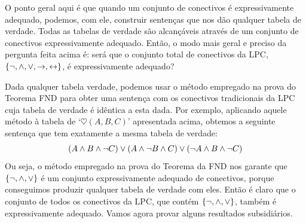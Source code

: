 O ponto geral aqui é que quando um conjunto de conectivos é expressivamente adequado, podemos, com ele, construir sentenças que nos dão qualquer tabela de verdade.
Todas as tabelas de verdade são alcançáveis através de um conjunto de conectivos expressivamente adequado.
Então, o modo mais geral e preciso da pergunta feita acima é: será que o conjunto total de conectivos da LPC, $\{\neg, \wedge, \vee, \rightarrow, \leftrightarrow\}$, é expressivamente adequado?

Dada qualquer tabela verdade, podemos usar o método empregado na prova do Teorema FND para obter uma sentença com os conectivos tradicionais da LPC cuja tabela de verdade é idêntica a esta dada.
Por exemplo, aplicando aquele método à tabela de `$\heartsuit(A, B, C)$' apresentada acima,  obtemos a seguinte sentença que tem exatamente a mesma tabela de verdade:
		$$(A \wedge B \wedge \neg C) \vee (A \wedge \neg B \wedge C) \vee (\neg A \wedge B \wedge \neg C)$$			
Ou seja, o método empregado na prova do Teorema da FND nos garante que $\{\neg, \wedge, \vee \}$ é um conjunto expressivamente adequado de conectivos, porque conseguimos produzir qualquer tabela de verdade com eles.
Então é claro que o conjunto de todos os conectivos da LPC, que contém $\{\neg, \wedge, \vee \}$, também é expressivamente adequado.
Vamos agora provar alguns resultados subsidiários.

